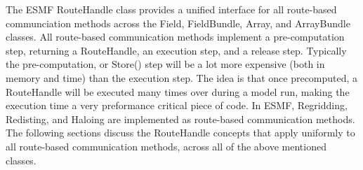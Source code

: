 %

\label{sec:RHandle}

The ESMF RouteHandle class provides a unified interface for all route-based communciation methods across the Field, FieldBundle, Array, and ArrayBundle classes. All route-based communication methods implement a pre-computation step, returning a RouteHandle, an execution step, and a release step. Typically the pre-computation, or Store() step will be a lot more expensive (both in memory and time) than the execution step. The idea is that once precomputed, a RouteHandle will be executed many times over during a model run, making the execution time a very preformance critical piece of code. In ESMF, Regridding, Redisting, and Haloing are implemented as route-based communication methods. The following sections discuss the RouteHandle concepts that apply uniformly to all route-based communication methods, across all of the above mentioned classes.





